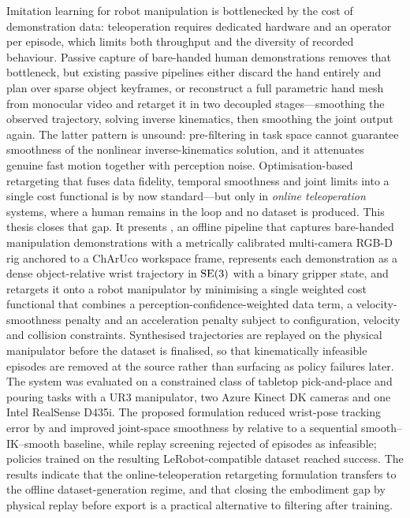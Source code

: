 \documentclass[12pt, a4paper, oneside]{report}
\begin{document}
Imitation learning for robot manipulation is bottlenecked by the cost of
demonstration data: teleoperation requires dedicated hardware and an
operator per episode, which limits both throughput and the diversity of
recorded behaviour. Passive capture of bare-handed human demonstrations
removes that bottleneck, but existing passive pipelines either discard the
hand entirely and plan over sparse object keyframes, or reconstruct a full
parametric hand mesh from monocular video and retarget it in two decoupled
stages---smoothing the observed trajectory, solving inverse kinematics, then
smoothing the joint output again. The latter pattern is unsound: pre-filtering
in task space cannot guarantee smoothness of the nonlinear inverse-kinematics
solution, and it attenuates genuine fast motion together with perception noise.
Optimisation-based retargeting that fuses data fidelity, temporal smoothness
and joint limits into a single cost functional is by now standard---but only in
\emph{online teleoperation} systems, where a human remains in the loop and no
dataset is produced. This thesis closes that gap. It presents \viki, an offline
pipeline that captures bare-handed manipulation demonstrations with a
metrically calibrated multi-camera RGB-D rig anchored to a ChArUco workspace
frame, represents each demonstration as a dense object-relative wrist
trajectory in $\mathrm{SE}(3)$ with a binary gripper state, and retargets it onto a robot
manipulator by minimising a single weighted cost functional that combines a
perception-confidence-weighted data term, a velocity-smoothness penalty and an
acceleration penalty subject to configuration, velocity and collision
constraints. Synthesised trajectories are replayed on the physical manipulator
before the dataset is finalised, so that kinematically infeasible episodes are
removed at the source rather than surfacing as policy failures later. The
system was evaluated on a constrained class of tabletop pick-and-place and
pouring tasks with a UR3 manipulator, two Azure Kinect DK cameras and one Intel
RealSense D435i. The proposed formulation reduced wrist-pose tracking error by
 and improved joint-space smoothness by  relative to a
sequential smooth--IK--smooth baseline, while replay screening rejected
 of episodes as infeasible; policies trained on the resulting
LeRobot-compatible dataset reached  success. The results indicate
that the online-teleoperation retargeting formulation transfers to the offline
dataset-generation regime, and that closing the embodiment gap by physical
replay before export is a practical alternative to filtering after training.
\end{document}
